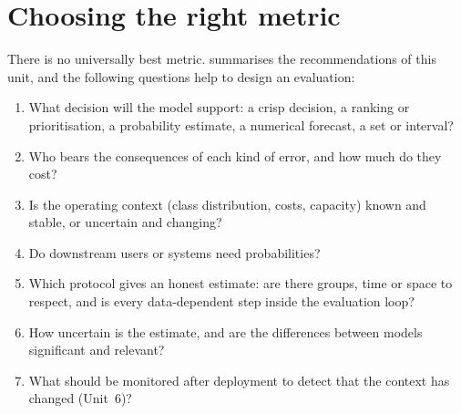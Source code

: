 \section{Choosing the right metric}\label{sec:choosing}

There is no universally best metric.  summarises the recommendations of this
unit, and the following questions help to design an evaluation:
\begin{enumerate}
  \item What decision will the model support: a crisp decision, a ranking or prioritisation, a
        probability estimate, a numerical forecast, a set or interval?
  \item Who bears the consequences of each kind of error, and how much do they cost?
  \item Is the operating context (class distribution, costs, capacity) known and stable, or
        uncertain and changing?
  \item Do downstream users or systems need probabilities?
  \item Which protocol gives an honest estimate: are there groups, time or space to respect, and
        is every data-dependent step inside the evaluation loop?
  \item How uncertain is the estimate, and are the differences between models significant and
        relevant?
  \item What should be monitored after deployment to detect that the context has changed
        (Unit~6)?
\end{enumerate}

